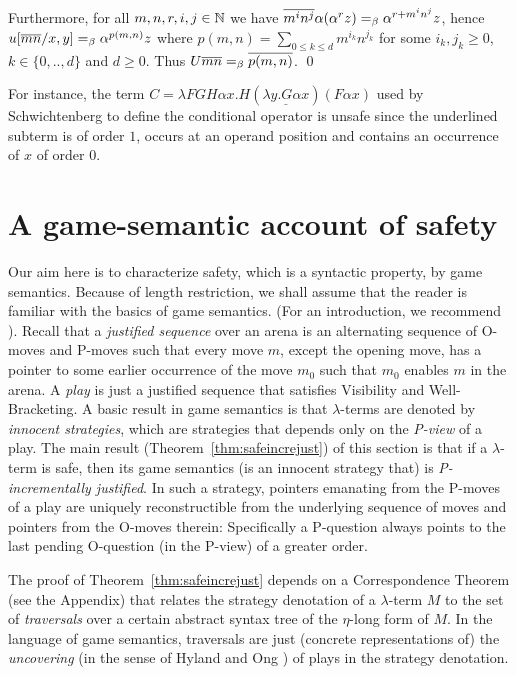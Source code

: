 Furthermore, for all $m,n,r,i,j\in \mathbb{N}$
we have $\overline{m^i n^j} \alpha (\alpha^r z) =_\beta
\alpha^{r + m^i n^j} z$,
hence $u[\overline{m} \overline{n}/x,y] =_\beta \alpha^{p(m,n)} z$ where $p(m,n) = \sum_{0\leq k \leq d} m^{i_k} n^{j_k}$ for some $i_k,j_k \geq 0$, $k \in\{ 0,..,d \}$ and $d\geq 0$.
Thus $U \overline{m} \overline{n} =_\beta \overline{p(m,n)}$. \qed


For instance, the term $ C = \lambda F G H \alpha x . H (
\underline{\lambda y . G \alpha x} ) (F \alpha x)$ used by
Schwichtenberg \cite{citeulike:622637} to define the conditional
operator is unsafe since the underlined subterm is of order $1$,
occurs at an operand position and contains an occurrence of $x$ of
order $0$.


\section{A game-semantic account of safety}
\label{sec:gamesemaccount}
Our aim here is to characterize safety, which is a syntactic property,
by game semantics. Because of length restriction, we shall assume that
the reader is familiar with the basics of game semantics.  (For an
introduction, we recommend \cite{abramsky:game-semantics-tutorial}). Recall that a \emph{justified sequence} over
an arena is an alternating sequence of O-moves and P-moves such that
every move $m$, except the opening move, has a pointer to some earlier
occurrence of the move $m_0$ such that $m_0$ enables $m$ in the
arena. A \emph{play} is just a justified sequence that satisfies
Visibility and Well-Bracketing. A basic result in game semantics is
that $\lambda$-terms are denoted by \emph{innocent strategies}, which
are strategies that depends only on the \emph{P-view} of a play. The
main result (Theorem~\ref{thm:safeincrejust}) of this section is that
if a $\lambda$-term is safe, then its game semantics (is an innocent
strategy that) is \emph{P-incrementally justified}. In such a
strategy, pointers emanating from the P-moves of a play are uniquely
reconstructible from the underlying sequence of moves and pointers
from the O-moves therein: Specifically a P-question always
points to the last pending O-question (in the P-view) of a greater
order.

The proof of Theorem~\ref{thm:safeincrejust} depends on a
Correspondence Theorem (see the Appendix) that relates the strategy
denotation of a $\lambda$-term $M$ to the set of \emph{traversals}
over a certain abstract syntax tree of the $\eta$-long form of $M$.
In the language of game semantics, traversals are just (concrete
representations of) the \emph{uncovering} (in the sense of Hyland
and Ong \cite{hylandong_pcf}) of plays in the strategy denotation.

